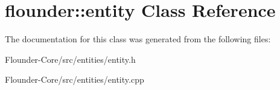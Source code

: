 \hypertarget{classflounder_1_1entity}{}\section{flounder\+:\+:entity Class Reference}
\label{classflounder_1_1entity}


The documentation for this class was generated from the following files\+:\begin{DoxyCompactItemize}
\item 
Flounder-\/\+Core/src/entities/entity.\+h\item 
Flounder-\/\+Core/src/entities/entity.\+cpp\end{DoxyCompactItemize}
